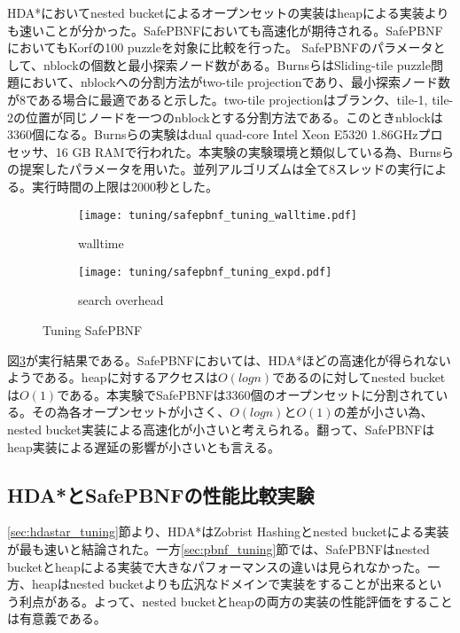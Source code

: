 \documentclass[uplatex]{jsarticle}
\begin{document}
HDA*においてnested bucketによるオープンセットの実装はheapによる実装よりも速いことが分かった。SafePBNFにおいても高速化が期待される。SafePBNFにおいてもKorfの100 puzzleを対象に比較を行った。
SafePBNFのパラメータとして、nblockの個数と最小探索ノード数がある。BurnsらはSliding-tile puzzle問題において、nblockへの分割方法がtwo-tile projectionであり、最小探索ノード数が8である場合に最適であると示した。two-tile projectionはブランク、tile-1, tile-2の位置が同じノードを一つのnblockとする分割方法である。このときnblockは3360個になる。Burnsらの実験はdual quad-core Intel Xeon E5320 1.86GHzプロセッサ、16 GB RAMで行われた。本実験の実験環境と類似している為、Burnsらの提案したパラメータを用いた。並列アルゴリズムは全て8スレッドの実行による。実行時間の上限は2000秒とした。
\newline

\begin{figure}[h]
	\centering
	\begin{subfigure}{0.4\columnwidth}
		\texttt{[image: tuning/safepbnf\_tuning\_walltime.pdf]}
		\caption{walltime}
		\label{fig:safepbnf_tuning_walltime}
	\end{subfigure}
	\begin{subfigure}{0.4\columnwidth}
		\texttt{[image: tuning/safepbnf\_tuning\_expd.pdf]}
		\caption{search overhead}
		\label{fig:safepbnf_tuning_expd}
	\end{subfigure}
	\caption{Tuning SafePBNF}
	\label{fig:safepbnf_tuning}
\end{figure}

図\ref{fig:safepbnf_tuning}が実行結果である。SafePBNFにおいては、HDA*ほどの高速化が得られないようである。heapに対するアクセスは$O(logn)$であるのに対してnested bucketは$O(1)$である。本実験でSafePBNFは3360個のオープンセットに分割されている。その為各オープンセットが小さく、$O(logn)$と$O(1)$の差が小さい為、nested bucket実装による高速化が小さいと考えられる。翻って、SafePBNFはheap実装による遅延の影響が小さいとも言える。

\subsection{HDA*とSafePBNFの性能比較実験}

\ref{sec:hdastar_tuning}節より、HDA*はZobrist Hashingとnested bucketによる実装が最も速いと結論された。一方\ref{sec:pbnf_tuning}節では、SafePBNFはnested bucketとheapによる実装で大きなパフォーマンスの違いは見られなかった。一方、heapはnested bucketよりも広汎なドメインで実装をすることが出来るという利点がある。よって、nested bucketとheapの両方の実装の性能評価をすることは有意義である。
\end{document}
